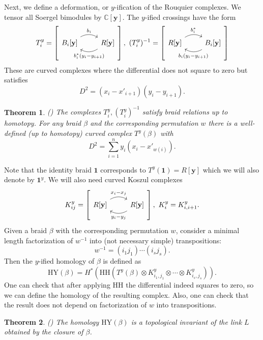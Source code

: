 \documentclass{amsart}
\newcommand{\C}{\mathbb{C}}
\newcommand{\yy}{\mathbf{y}}
\newcommand{\HY}{\mathrm{HY}}
\newcommand{\one}{\mathbf{1}}
\newcommand{\HH}{\mathrm{HH}}
\numberwithin{equation}{section}
\newtheorem{theorem}{Theorem}[section]
\theoremstyle{definition}
\begin{document}
Next, we define a deformation, or $y$-ification of the Rouquier complexes. We tensor all Soergel bimodules by $\C[\yy]$. The $y$-ified crossings have the form
$$
T_i^y=\left[
\begin{tikzcd}
B_i[\yy]\arrow[bend left]{r}{b_i} & R[\yy] \arrow[bend left]{l}{b_i^*(y_i-y_{i+1})}
\end{tikzcd}
\right],\ (T_i^y)^{-1}=\left[
\begin{tikzcd}
R[\yy]\arrow[bend left]{r}{b_i^*} & B_i[\yy] \arrow[bend left]{l}{b_i(y_i-y_{i+1})}
\end{tikzcd}
\right]
$$
These are curved complexes where the  differential  does not square to zero but satisfies $$D^2=(x_i-x'_{i+1})(y_i-y_{i+1}).$$

\begin{theorem}(\cite{GH})
The complexes $T_i^y,(T_i^y)^{-1}$ satisfy braid relations up to homotopy. For any braid $\beta$ and the corresponding permutation $w$ there is a well-defined (up to homotopy) curved complex $T^y(\beta)$ with 
\begin{equation}
\label{eq: curvature}
D^2=\sum_{i=1}^{n}y_i(x_i-x'_{w(i)}).
\end{equation}
\end{theorem}

Note that the identity braid $\one$ corresponds to $T^y(\one)=R[\yy]$ which we will also denote by $\one^y$.
We will also need curved Koszul complexes 
$$
K_{ij}^y=\left[
\begin{tikzcd}
R[\yy]\arrow[bend left]{r}{x_i-x_j} & R[\yy] \arrow[bend left]{l}{y_i-y_j}
\end{tikzcd}
\right],\ K_i^y=K_{i,i+1}^y.
$$
Given a braid $\beta$ with the corresponding permutation $w$, consider a minimal length factorization of $w^{-1}$ into (not necessary simple) transpositions:
$$
w^{-1}=(i_1 j_1)\cdots (i_s j_s).
$$
Then the $y$-ified homology of $\beta$ is defined as
\begin{equation}
\label{eq: def HY}
\HY(\beta)=H^*\left(\HH\left(T^y(\beta)\otimes K^y_{i_1,j_1}\otimes \cdots \otimes K_{i_s,j_s}^y\right)\right).
\end{equation}
One can check that after applying $\HH$ the differential indeed squares to zero, so we can define the homology of the resulting complex. Also, one can check that the result does not depend on factorization of $w$ into transpositions.

\begin{theorem}(\cite{GH})
The homology $\HY(\beta)$ is a topological invariant of the link $L$ obtained by the closure of $\beta$.
\end{theorem}
\end{document}
